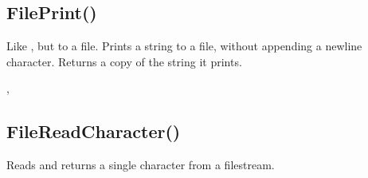 \documentclass[letterpaper,10pt,english]{sphinxmanual}
\begin{document}
\ignorespaces 

\subsection{FilePrint()}
\label{\detokenize{reference/peblstream:fileprint}}\label{\detokenize{reference/peblstream:index-14}}
\sphinxAtStartPar
{}

\sphinxAtStartPar
Like , but to a file.  Prints a   string to a file,   without appending a newline character.  Returns a   copy of the string it prints.

\sphinxAtStartPar
{}

\begin{sphinxVerbatim}[commandchars=\\\{\}]
\end{sphinxVerbatim}

\sphinxAtStartPar
{}

\begin{sphinxVerbatim}[commandchars=\\\{\}]
\end{sphinxVerbatim}

\sphinxAtStartPar
{}

\sphinxAtStartPar
{}, 

\ignorespaces 

\subsection{FileReadCharacter()}
\label{\detokenize{reference/peblstream:filereadcharacter}}\label{\detokenize{reference/peblstream:index-15}}
\sphinxAtStartPar
{}

\sphinxAtStartPar
{}

\sphinxAtStartPar
Reads and returns a single character from a filestream.
\end{document}
